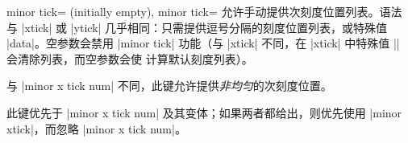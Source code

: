 \begin{pgfplotsxykeylist}{%
    minor \x tick= (initially empty),%
    minor tick=%
}
    允许手动提供次刻度位置列表。语法与 |xtick| 或 |ytick| 几乎相同：只需提供逗号分隔的刻度位置列表，或特殊值 |data|。空参数会禁用 |minor tick| 功能（与 |xtick| 不同，在 |xtick| 中特殊值 |\empty| 会清除列表，而空参数会使 \PGFPlots{} 计算默认刻度列表）。

    与 |minor x tick num| 不同，此键允许提供\emph{非均匀}的次刻度位置。
\begin{codeexample}[]
\end{codeexample}

\begin{codeexample}[]
\end{codeexample}

    此键优先于 |minor x tick num| 及其变体；如果两者都给出，则优先使用 |minor xtick|，而忽略 |minor x tick num|。
\end{pgfplotsxykeylist}


